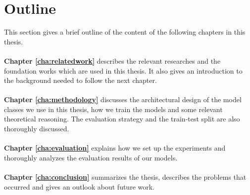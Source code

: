 \section{Outline\label{sec:outline}}

This section gives a brief outline of the content of the following chapters in this
thesis.
\\
\\
\textbf{Chapter \ref{cha:relatedwork}} describes the relevant researches and the
foundation works which are used in this thesis. It also gives an introduction to the
background needed to follow the next chapter.
\\
\\
\textbf{Chapter \ref{cha:methodology}} discusses the architectural design of the model
classes we use in this thesis, how we train the models and some relevant theoretical
reasoning. The evaluation strategy and the train-test split are also thoroughly discussed.
\\
\\
\textbf{Chapter \ref{cha:evaluation}} explains how we set up the experiments and
thoroughly analyzes  the evaluation results of our models.
\\
\\
\textbf{Chapter \ref{cha:conclusion}} summarizes the thesis, describes the problems that
occurred and gives an outlook about future work.
